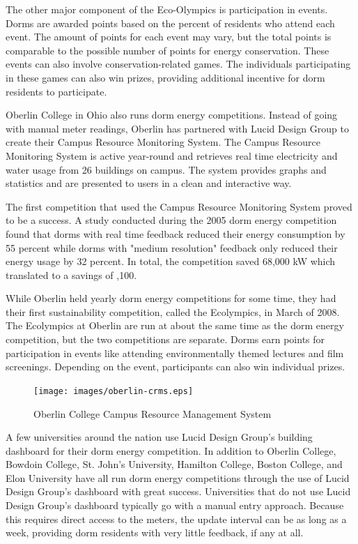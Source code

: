 The other major component of the Eco-Olympics is participation in events.  Dorms are awarded points based on the percent of residents who attend each event.  The amount of points for each event may vary, but the total points is comparable to the possible number of points for energy conservation.  These events can also involve conservation-related games.  The individuals participating in these games can also win prizes, providing additional incentive for dorm residents to participate.

Oberlin College in Ohio also runs dorm energy competitions.  Instead of going with manual meter readings, Oberlin has partnered with Lucid Design Group to create their Campus Resource Monitoring System\cite{oberlin-comp}.  The Campus Resource Monitoring System is active year-round and retrieves real time electricity and water usage from 26 buildings\cite{lucid-oberlin} on campus.  The system provides graphs and statistics and are presented to users in a clean and interactive way.

The first competition that used the Campus Resource Monitoring System proved to be a success.  A study conducted during the 2005 dorm energy competition found that dorms with real time feedback reduced their energy consumption by 55 percent while dorms with "medium resolution" feedback only reduced their energy usage by 32 percent\cite{oberlin-goals}.  In total, the competition saved 68,000 kW which translated to a savings of ,100.

While Oberlin held yearly dorm energy competitions for some time, they had their first sustainability competition, called the Ecolympics, in March of 2008\cite{oberlin-history}.  The Ecolympics at Oberlin are run at about the same time as the dorm energy competition, but the two competitions are separate.  Dorms earn points for participation in events like attending environmentally themed lectures and film screenings\cite{oberlin-news}.  Depending on the event, participants can also win individual prizes.

\begin{figure}[h]
	\texttt{[image: images/oberlin-crms.eps]}
	\caption{Oberlin College Campus Resource Management System}
\end{figure}

A few universities around the nation use Lucid Design Group's building dashboard for their dorm energy competition.  In addition to Oberlin College, Bowdoin College, St. John's University, Hamilton College, Boston College, and Elon University have all run dorm energy competitions through the use of Lucid Design Group's dashboard\cite{lucid-competitions} with great success.  Universities that do not use Lucid Design Group's dashboard typically go with a manual entry approach.  Because this requires direct access to the meters, the update interval can be as long as a week, providing dorm residents with very little feedback, if any at all.


